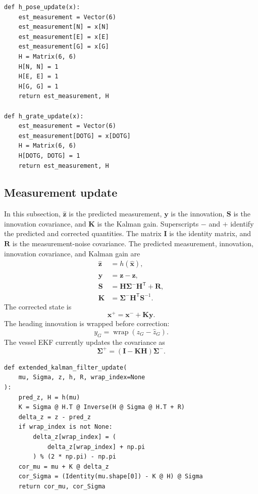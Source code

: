 \documentclass[11pt,a4paper]{article}
\begin{document}
\begin{lstlisting}
def h_pose_update(x):
    est_measurement = Vector(6)
    est_measurement[N] = x[N]
    est_measurement[E] = x[E]
    est_measurement[G] = x[G]
    H = Matrix(6, 6)
    H[N, N] = 1
    H[E, E] = 1
    H[G, G] = 1
    return est_measurement, H

def h_grate_update(x):
    est_measurement = Vector(6)
    est_measurement[DOTG] = x[DOTG]
    H = Matrix(6, 6)
    H[DOTG, DOTG] = 1
    return est_measurement, H
\end{lstlisting}

\subsection{Measurement update}

In this subsection, $\hat{\bm{z}}$ is the predicted measurement, $\bm{y}$ is
the innovation, $\bm{S}$ is the innovation covariance, and $\bm{K}$ is the
Kalman gain. Superscripts $-$ and $+$ identify the predicted and corrected
quantities. The matrix $\bm{I}$ is the identity matrix, and $\bm{R}$ is the
measurement-noise covariance. The predicted measurement, innovation,
innovation covariance, and Kalman gain are
\begin{align}
\hat{\bm{z}}&=h(\hat{\bm{x}}),\\
\bm{y}&=\bm{z}-\hat{\bm{z}},\\
\bm{S}&=\bm{H}\bm{\Sigma}^{-}\bm{H}^{\mathsf T}+\bm{R},\\
\bm{K}&=\bm{\Sigma}^{-}\bm{H}^{\mathsf T}\bm{S}^{-1}.
\end{align}
The corrected state is
\begin{equation}
\bm{x}^{+}=\bm{x}^{-}+\bm{K}\bm{y}.
\end{equation}
The heading innovation is wrapped before correction:
\begin{equation}
y_G=\operatorname{wrap}(z_G-\hat z_G).
\end{equation}
The vessel EKF currently updates the covariance as
\begin{equation}
\bm{\Sigma}^{+}=(\bm{I}-\bm{K}\bm{H})\bm{\Sigma}^{-}.
\end{equation}

\begin{lstlisting}
def extended_kalman_filter_update(
    mu, Sigma, z, h, R, wrap_index=None
):
    pred_z, H = h(mu)
    K = Sigma @ H.T @ Inverse(H @ Sigma @ H.T + R)
    delta_z = z - pred_z
    if wrap_index is not None:
        delta_z[wrap_index] = (
            delta_z[wrap_index] + np.pi
        ) % (2 * np.pi) - np.pi
    cor_mu = mu + K @ delta_z
    cor_Sigma = (Identity(mu.shape[0]) - K @ H) @ Sigma
    return cor_mu, cor_Sigma
\end{lstlisting}
\end{document}
